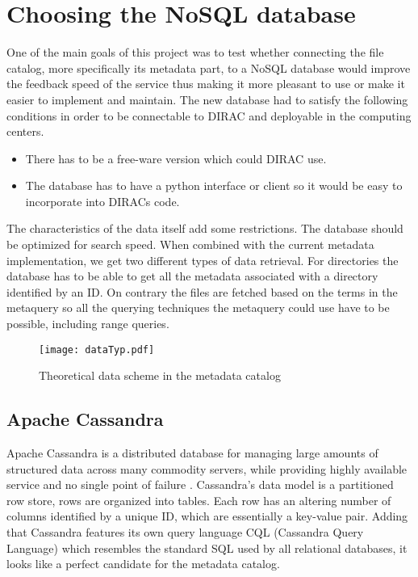 \chapter{Choosing the NoSQL database}
\label{chap:databases}
One of the main goals of this project was to test whether connecting the 
file catalog, more specifically its metadata part, to a NoSQL database would 
improve the feedback speed of the service thus making it more pleasant to use
or make it easier to implement and maintain. The new database had to satisfy the
following conditions in order to be connectable to DIRAC and deployable in
the computing centers.

\begin{itemize}
\item There has to be a free-ware version which could DIRAC use.
\item The database has to have a python interface or client so it would be easy
to incorporate into DIRACs code.
\end{itemize}

The characteristics of the data itself add some restrictions. The database should be
optimized for search speed. When combined with the current metadata implementation, we
get two different types of data retrieval. For directories 
the database has to be able to get all the metadata associated with a directory
identified by an ID. On contrary the files are fetched based on the terms in the metaquery so
all the querying techniques the metaquery could use have to be possible, including
range queries. 

\begin{figure}[h]
\centering
\caption{Theoretical data scheme in the metadata catalog}
\texttt{[image: dataTyp.pdf]}
\label{fig:theoDataScheme}
\end{figure}


\section{Apache Cassandra}
Apache Cassandra is a distributed database for managing large amounts of structured data 
across many commodity servers, while providing highly available service and no single point 
of failure \cite{cassandra}. Cassandra's data model is a
partitioned row store, rows are organized into tables. Each row
has an altering number of columns identified by a unique ID, which are essentially a
key-value pair. Adding that Cassandra features
its own query language CQL (Cassandra Query Language) which resembles the standard SQL 
used by all relational databases, it looks like a perfect candidate for the metadata catalog.

